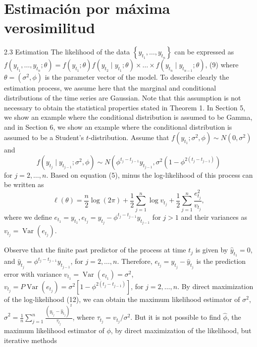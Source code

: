 \section{Estimación por máxima verosimilitud}
2.3 Estimation
The likelihood of the data $\left\{y_{t_1}, \ldots, y_{t_n}\right\}$ can be expressed as $f\left(y_{t_1}, \ldots, y_{t_n} ; \theta\right)=f\left(y_{t_1} ; \theta\right) f\left(y_{t_2} \mid y_{t_1} ; \theta\right) \times \ldots \times f\left(y_{t_n} \mid y_{t_{n-1}} ; \theta\right)$, (9) where $\theta=\left(\sigma^2, \phi\right)$ is the parameter vector of the model. To describe clearly the estimation process, we assume here that the marginal and conditional distributions of the time series are Gaussian. Note that this assumption is not necessary to obtain the statistical properties stated in Theorem 1. In Section 5, we show an example where the conditional distribution is assumed to be Gamma, and in Section 6, we show an example where the conditional distribution is assumed to be a Student's $t$-distribution.
Assume that
$f\left(y_{t_1} ; \sigma^2, \phi\right) \sim N\left(0, \sigma^2\right)$ and
$$
f\left(y_{t_j} \mid y_{t_{j-1}} ; \sigma^2, \phi\right) \sim N\left(\phi^{t_j-t_{j-1}} y_{t_{j-1}}, \sigma^2\left(1-\phi^{2\left(t_j-t_{j-1}\right)}\right)\right.
$$
for $j=2, \ldots, n$. Based on equation (5), minus the log-likelihood of this process can be written as
$$
\ell(\theta)=\frac{n}{2} \log (2 \pi)+\frac{1}{2} \sum_{j=1}^n \log v_{t_j}+\frac{1}{2} \sum_{j=1}^n \frac{e_{t_j}^2}{v_{t_j}},
$$
where we define $e_{t_1}=y_{t_1}, e_{t_j}=y_{t_j}-\phi^{t_j-t_{j-1}} y_{t_{j-1}}$ for $j>1$ and their variances as $v_{t_j}=\operatorname{Var}\left(e_{t_j}\right)$.

Observe that the finite past predictor of the process at time $t_j$ is given by
$\widehat{y}_{t_1}=0$, and $\widehat{y}_{t_j}=\phi^{t_j-t_{j-1}} y_{t_{j-1}}$, for $j=2, \ldots, n$.
Therefore, $e_{t_j}=y_{t_j}-\widehat{y}_{t_j}$ is the prediction error with variance $v_{t_1}=\operatorname{Var}\left(e_{t_1}\right)=\sigma^2$,
$v_{t_j}=P \operatorname{Var}\left(e_{t_j}\right)=\sigma^2\left[1-\phi^{2\left(t_j-t_{j-1}\right)}\right]$, for $j=2, \ldots, n$.
By direct maximization of the log-likelihood (12), we can obtain the maximum likelihood estimator of $\sigma^2$,
$\hat{\sigma}^2=\frac{1}{n} \sum_{j=1}^n \frac{\left(y_{t_j}-\widehat{y}_{t_j}\right)^2}{\tau_{t_j}}$, where $\tau_{t_j}=v_{t_j} / \sigma^2$.
But it is not possible to find $\widehat{\phi}$, the maximum likelihood estimator of $\phi$, by direct maximization of the likelihood, but iterative methods

